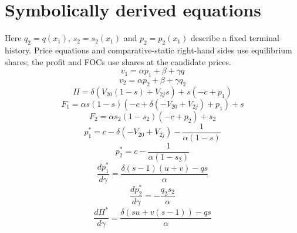 \section{Symbolically derived equations}
Here $q_2=q(x_1)$, $s_2=s_2(x_1)$ and $p_2=p_2(x_1)$ describe a fixed terminal history. Price equations and comparative-static right-hand sides use equilibrium shares; the profit and FOCs use shares at the candidate prices.
\[
v_1 = \alpha p_{1} + \beta + \gamma q
\]
\[
v_2 = \alpha p_{2} + \beta + \gamma q_{2}
\]
\[
\Pi = \delta \left(V_{20} \left(1 - s\right) + V_{2j} s\right) + s \left(- c + p_{1}\right)
\]
\[
F_1 = \alpha s \left(1 - s\right) \left(- c + \delta \left(- V_{20} + V_{2j}\right) + p_{1}\right) + s
\]
\[
F_2 = \alpha s_{2} \left(1 - s_{2}\right) \left(- c + p_{2}\right) + s_{2}
\]
\[
p_1^* = c - \delta \left(- V_{20} + V_{2j}\right) - \frac{1}{\alpha \left(1 - s\right)}
\]
\[
p_2^* = c - \frac{1}{\alpha \left(1 - s_{2}\right)}
\]
\[
\frac{dp_1^*}{d\gamma} = \frac{\delta \left(s - 1\right) \left(u + v\right) - q s}{\alpha}
\]
\[
\frac{dp_2^*}{d\gamma} = - \frac{q_{2} s_{2}}{\alpha}
\]
\[
\frac{d\Pi^*}{d\gamma} = \frac{\delta \left(s u + v \left(s - 1\right)\right) - q s}{\alpha}
\]
